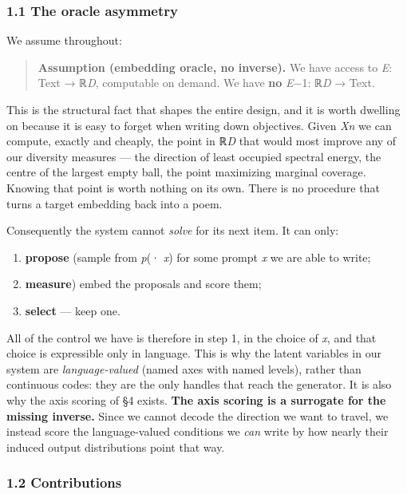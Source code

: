 \documentclass[
  11pt,
]{article}
\providecommand{\tightlist}{%
  \setlength{\itemsep}{0pt}\setlength{\parskip}{0pt}}
\theoremstyle{plain}
\theoremstyle{definition}
\providecommand{\tightlist}{%
  \setlength{\itemsep}{0pt}\setlength{\parskip}{0pt}}
\begin{document}
\subsubsection{1.1 The oracle asymmetry}\label{11-the-oracle-asymmetry}

We assume throughout:

\begin{quote}
\textbf{Assumption (embedding oracle, no inverse).} We have access to
\emph{E}: Text → ℝ\emph{D}, computable on demand. We have \textbf{no}
\emph{E}−1: ℝ\emph{D} → Text.
\end{quote}

This is the structural fact that shapes the entire design, and it is
worth dwelling on because it is easy to forget when writing down
objectives. Given \emph{Xn} we can compute, exactly and cheaply, the
point in ℝ\emph{D} that would most improve any of our diversity measures
--- the direction of least occupied spectral energy, the centre of the
largest empty ball, the point maximizing marginal coverage. Knowing that
point is worth nothing on its own. There is no procedure that turns a
target embedding back into a poem.

Consequently the system cannot \emph{solve} for its next item. It can
only:

\begin{enumerate}
\def\labelenumi{\arabic{enumi}.}
\tightlist
\item
  \textbf{propose} (sample from \emph{p}(· \textbar{} \emph{x}) for some
  prompt \emph{x} we are able to write;
\item
  \textbf{measure}) embed the proposals and score them;
\item
  \textbf{select} --- keep one.
\end{enumerate}

All of the control we have is therefore in step 1, in the choice of
\emph{x}, and that choice is expressible only in language. This is why
the latent variables in our system are \emph{language-valued} (named
axes with named levels), rather than continuous codes: they are the only
handles that reach the generator. It is also why the axis scoring of §4
exists. \textbf{The axis scoring is a surrogate for the missing
inverse.} Since we cannot decode the direction we want to travel, we
instead score the language-valued conditions we \emph{can} write by how
nearly their induced output distributions point that way.

\subsubsection{1.2 Contributions}\label{12-contributions}
\end{document}
